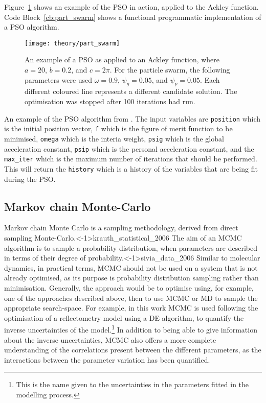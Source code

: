 Figure~\ref{fig:part_swarm} shows an example of the PSO in action, applied to the Ackley function.\autocite{ackley_connectionist_1987}
Code Block~\ref{cb:part_swarm} shows a functional programmatic implementation of a PSO algorithm.
%
\begin{figure}[t]
    \forcerectofloat
    \centering
    \texttt{[image: theory/part\_swarm]}
    \caption{An example of a PSO as applied to an Ackley function, where $a=20$, $b=0.2$, and $c=2\pi$. For the particle swarm, the following parameters were used $\omega=0.9$, $\psi_g=0.05$, and $\psi_p=0.05$. Each different coloured line represents a different candidate solution. The optimisation was stopped after \num{100} iterations had run.}
    \label{fig:part_swarm}
\end{figure}
%
\begin{listing}[t]
    \centering
    \caption{An example of the PSO algorithm from \cite{poli_analysis_2008}. The input variables are \texttt{position} which is the initial position vector, \texttt{f} which is the figure of merit function to be minimised, \texttt{omega} which is the interia weight, \texttt{psig} which is the global acceleration constant, \texttt{psip} which is the personal acceleration constant, and the \texttt{max\_iter} which is the maximum number of iterations that should be performed. This will return the \texttt{history} which is a history of the variables that are being fit during the PSO.}
    
    \label{cb:part_swarm}
\end{listing}
%

\subsection{Markov chain Monte-Carlo}
\label{sec:mcmc}
Markov chain Monte Carlo is a sampling methodology, derived from direct sampling Monte-Carlo.\sidecite<-1\baselineskip>{krauth_statistical_2006}
The aim of an MCMC algorithm is to sample a probability distribution, when parameters are described in terms of their degree of probability.\sidecite<-1\baselineskip>{sivia_data_2006}
Similar to molecular dynamics, in practical terms, MCMC should not be used on a system that is not already optimised, as its purpose is probability distribution sampling rather than minimisation.
Generally, the approach would be to optimise using, for example, one of the approaches described above, then to use MCMC or MD to sample the appropriate search-space.
For example, in this work MCMC is used following the optimisation of a reflectometry model using a DE algorithm, to quantify the inverse uncertainties of the model.\footnote{This is the name given to the uncertainties in the parameters fitted in the modelling process.}
In addition to being able to give information about the inverse uncertainties, MCMC also offers a more complete understanding of the correlations present between the different parameters,\autocite{gilks_markov_1995} as the interactions between the parameter variation has been quantified.

